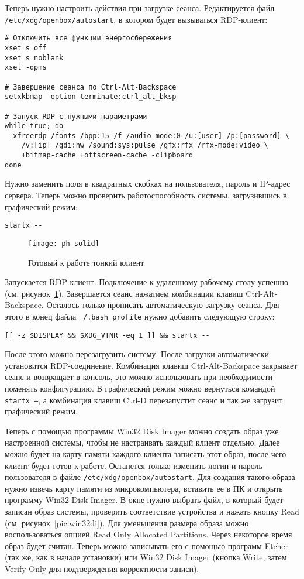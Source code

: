 Теперь нужно настроить действия при загрузке сеанса. Редактируется файл
\texttt{/etc/xdg/openbox/autostart}, в котором будет вызываться RDP-клиент:
\begin{verbatim}
# Отключить все функции энергосбережения
xset s off
xset s noblank
xset -dpms

# Завершение сеанса по Ctrl-Alt-Backspace
setxkbmap -option terminate:ctrl_alt_bksp

# Запуск RDP с нужными параметрами
while true; do
  xfreerdp /fonts /bpp:15 /f /audio-mode:0 /u:[user] /p:[password] \
    /v:[ip] /gdi:hw /sound:sys:pulse /gfx:rfx /rfx-mode:video \
    +bitmap-cache +offscreen-cache -clipboard
done
\end{verbatim}

Нужно заменить поля в квадратных скобках на пользователя, пароль и IP-адрес сервера.
Теперь можно проверить работоспособность системы, загрузившись в графический режим:
\begin{verbatim}
startx --
\end{verbatim}

\begin{figure}[p]
    \center
    \texttt{[image: ph-solid]}
    \caption{Готовый к работе тонкий клиент}
    \label{pic:ph-solid}
\end{figure}

Запускается RDP-клиент. Подключение к удаленному рабочему столу успешно (см.
рисунок~\ref{pic:ph-solid}). Завершается сеанс нажатием комбинации клавиш
Ctrl-Alt-Backspace. Осталось только прописать автоматическую загрузку сеанса. Для этого
в конец файла \texttt{~/.bash\_profile} нужно добавить следующую строку:
\begin{verbatim}
[[ -z $DISPLAY && $XDG_VTNR -eq 1 ]] && startx --
\end{verbatim}

После этого можно перезагрузить систему. После загрузки автоматически установится
RDP-соединение. Комбинация клавиш Ctrl-Alt-Backspace закрывает сеанс и возвращает в
консоль, это можно использовать при необходимости поменять конфигурацию. В графический
режим можно вернуться командой \texttt{startx --}, а комбинация клавиш Ctrl-D
перезапустит сеанс и так же загрузит графический режим.

Теперь с помощью программы Win32 Disk Imager \cite{ref:win32di} можно создать образ уже
настроенной системы, чтобы не настраивать каждый клиент отдельно. Далее можно будет на
карту памяти каждого клиента записать этот образ, после чего клиент будет готов к
работе. Останется только изменить логин и пароль пользователя в файле
\texttt{/etc/xdg/openbox/autostart}. Для создания такого образа нужно извечь карту
памяти из микрокомпьютера, вставить ее в ПК и открыть программу Win32 Disk Imager. В
окне нужно выбрать файл, в который будет записан образ системы, проверить соответствие
устройства и нажать кнопку Read (см. рисунок~\ref{pic:win32di}). Для уменьшения размера
образа можно воспользоваться опцией Read Only Allocated Partitions. Через некоторое
время образ будет считан. Теперь можно записывать его с помощью программ Etcher (так же,
как в начале установки) или Win32 Disk Imager (кнопка Write, затем Verify Only для
подтверждения корректности записи).

